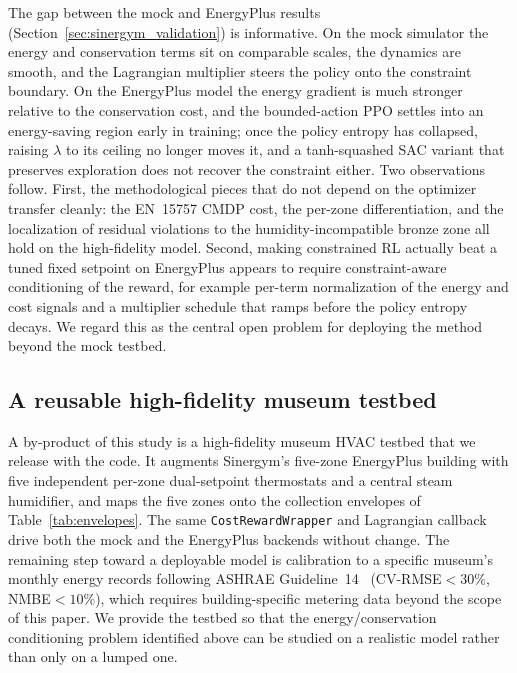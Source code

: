 \documentclass[11pt,a4paper]{article}
\begin{document}
The gap between the mock and EnergyPlus results
(Section~\ref{sec:sinergym_validation}) is informative. On the mock
simulator the energy and conservation terms sit on comparable scales,
the dynamics are smooth, and the Lagrangian multiplier steers the
policy onto the constraint boundary. On the EnergyPlus model the
energy gradient is much stronger relative to the conservation cost,
and the bounded-action PPO settles into an energy-saving region early
in training; once the policy entropy has collapsed, raising $\lambda$
to its ceiling no longer moves it, and a tanh-squashed SAC variant
that preserves exploration does not recover the constraint either.
Two observations follow. First, the methodological pieces that do not
depend on the optimizer transfer cleanly: the EN~15757 CMDP cost, the
per-zone differentiation, and the localization of residual violations
to the humidity-incompatible bronze zone all hold on the high-fidelity
model. Second, making constrained RL actually beat a tuned fixed
setpoint on EnergyPlus appears to require constraint-aware conditioning
of the reward, for example per-term normalization of the energy and
cost signals and a multiplier schedule that ramps before the policy
entropy decays. We regard this as the central open problem for
deploying the method beyond the mock testbed.

\subsection{A reusable high-fidelity museum testbed}

A by-product of this study is a high-fidelity museum HVAC testbed that
we release with the code. It augments Sinergym's five-zone EnergyPlus
building with five independent per-zone dual-setpoint thermostats and a
central steam humidifier, and maps the five zones onto the collection
envelopes of Table~\ref{tab:envelopes}. The same
\texttt{CostRewardWrapper} and Lagrangian callback drive both the mock
and the EnergyPlus backends without change. The remaining step toward a
deployable model is calibration to a specific museum's monthly energy
records following ASHRAE Guideline~14~\citep{ashrae_guideline14}
(CV-RMSE${<}30\%$, NMBE${<}10\%$), which requires building-specific
metering data beyond the scope of this paper. We provide the testbed so
that the energy/conservation conditioning problem identified above can
be studied on a realistic model rather than only on a lumped one.

\end{document}
